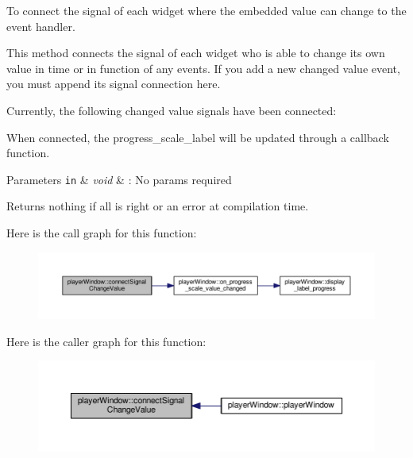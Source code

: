 To connect the signal of each widget where the embedded value can change to the event handler. 

This method connects the signal of each widget who is able to change its own value in time or in function of any events. If you add a new changed value event, you must append its signal connection here.\par
 \par
 Currently, the following changed value signals have been connected\-:\par
 \begin{DoxyItemize}
\item { When} connected, the progress\-\_\-scale\-\_\-label will be updated through a callback function. \par
 \par
 
\begin{DoxyParams}[1]{Parameters}
\mbox{\tt in}  & {\em void} & \-: No params required \\
\hline
\end{DoxyParams}
\begin{DoxyReturn}{Returns}
nothing if all is right or an error at compilation time. 
\end{DoxyReturn}
\end{DoxyItemize}


Here is the call graph for this function\-:\nopagebreak
\begin{figure}[H]
\begin{center}
\leavevmode
\includegraphics[width=350pt]{classplayerWindow_a57c7d3028404d831bbecca99ecd2e6bf_cgraph}
\end{center}
\end{figure}




Here is the caller graph for this function\-:\nopagebreak
\begin{figure}[H]
\begin{center}
\leavevmode
\includegraphics[width=350pt]{classplayerWindow_a57c7d3028404d831bbecca99ecd2e6bf_icgraph}
\end{center}
\end{figure}


